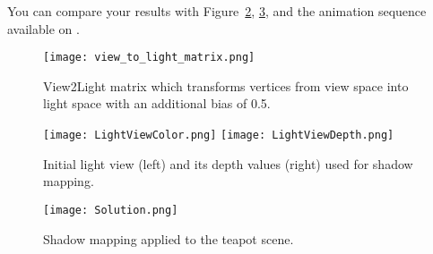 \documentclass[12pt, a4paper, oneside, ngerman]{article}
\begin{document}
You can compare your results with Figure~\ref{fig:textures}, \ref{fig:solution}, and the animation sequence available on \Moodle.

\begin{figure}
  \centering
  \texttt{[image: view\_to\_light\_matrix.png]}
  \caption{View2Light matrix which transforms vertices from view space into light space with an additional bias of 0.5.}
  \label{fig:view_to_light_matrix}
\end{figure}

\begin{figure}
  \centering
  \texttt{[image: LightViewColor.png]}
  \texttt{[image: LightViewDepth.png]}
  \caption{Initial light view (left) and its depth values (right) used for shadow mapping.}
  \label{fig:textures}
\end{figure}

\begin{figure}
  \centering
  \texttt{[image: Solution.png]}
  \caption{Shadow mapping applied to the teapot scene.}
  \label{fig:solution}
\end{figure}
\end{document}

